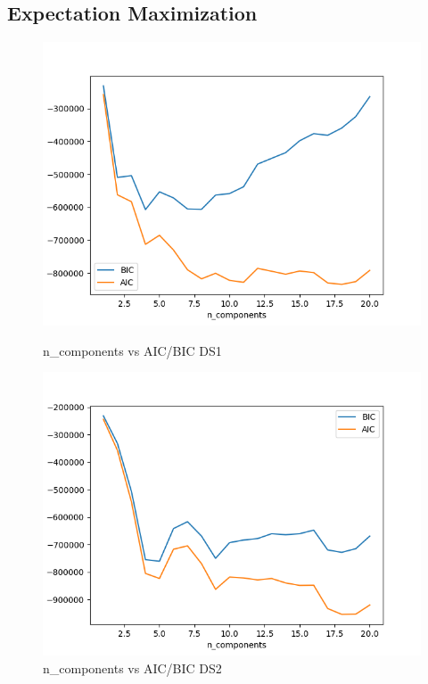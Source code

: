 \subsection{Expectation Maximization}\label{subsec:expectation-maximization}
\begin{figure}
    \begin{minipage}{0.5\textwidth}
        \centering
        \includegraphics[width=.9\linewidth]{gmmcomponentsds1.png}
        \caption{n\_components vs AIC/BIC DS1}\label{Fig:GMM DS1}
    \end{minipage}\hfill
    \begin{minipage}{0.5\textwidth}
        \centering
        \includegraphics[width=.9\linewidth]{gmmcomponentsds2.png}
        \caption{n\_components vs AIC/BIC DS2}\label{Fig:GMM DS2}
    \end{minipage}
\end{figure}
